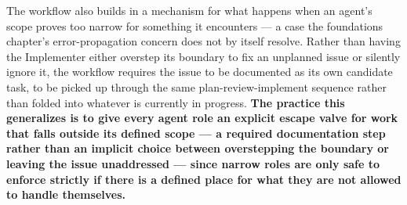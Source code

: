 The workflow also builds in a mechanism for what happens when an agent's scope proves too narrow for something it encounters --- a case the foundations chapter's error-propagation concern does not by itself resolve. Rather than having the Implementer either overstep its boundary to fix an unplanned issue or silently ignore it, the workflow requires the issue to be documented as its own candidate task, to be picked up through the same plan-review-implement sequence rather than folded into whatever is currently in progress. \textbf{The practice this generalizes is to give every agent role an explicit escape valve for work that falls outside its defined scope --- a required documentation step rather than an implicit choice between overstepping the boundary or leaving the issue unaddressed --- since narrow roles are only safe to enforce strictly if there is a defined place for what they are not allowed to handle themselves.}

